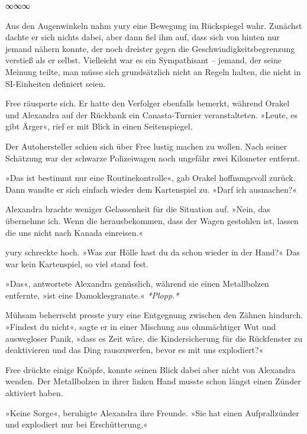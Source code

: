 \begin{center}
	∞∞∞
\end{center}

Aus den Augenwinkeln nahm yury eine Bewegung im Rückspiegel wahr. Zunächst dachte er sich nichts dabei, aber dann fiel ihm auf, dass sich von hinten nur jemand nähern konnte, der noch dreister gegen die Geschwindigkeitsbegrenzung verstieß als er selbst. Vielleicht war es ein Sympathisant – jemand, der seine Meinung teilte, man müsse sich grundsätzlich nicht an Regeln halten, die nicht in SI-Einheiten definiert seien.

Free räusperte sich. Er hatte den Verfolger ebenfalls bemerkt, während Orakel und Alexandra auf der Rückbank ein Canasta-Turnier veranstalteten. »Leute, es gibt Ärger«, rief er mit Blick in einen Seitenspiegel.

 Der Autohersteller schien sich über Free lustig machen zu wollen. Nach seiner Schätzung war der schwarze Polizeiwagen noch ungefähr zwei Kilometer entfernt.

»Das ist bestimmt nur eine Routinekontrolle«, gab Orakel hoffnungsvoll zurück. Dann wandte er sich einfach wieder dem Kartenspiel zu. »Darf ich ausmachen?«

Alexandra brachte weniger Gelassenheit für die Situation auf. »Nein, das übernehme ich. Wenn die herausbekommen, dass der Wagen gestohlen ist, lassen die uns nicht nach Kanada einreisen.«

yury schreckte hoch. »Was zur Hölle hast du da schon wieder in der Hand?« Das war kein Kartenspiel, so viel stand fest.

»Das«, antwortete Alexandra genüsslich, während sie einen Metallbolzen entfernte, »ist eine Damoklesgranate.« \textit{*Plopp.*}

Mühsam beherrscht presste yury eine Entgegnung zwischen den Zähnen hindurch. »Findest du nicht«, sagte er in einer Mischung aus ohnmächtiger Wut und auswegloser Panik, »dass es Zeit wäre, die Kindersicherung für die Rückfenster zu deaktivieren und das Ding rauszuwerfen, bevor es mit uns explodiert?«

Free drückte einige Knöpfe, konnte seinen Blick dabei aber nicht von Alexandra wenden. Der Metallbolzen in ihrer linken Hand musste schon längst einen Zünder aktiviert haben.

»Keine Sorge«, beruhigte Alexandra ihre Freunde. »Sie hat einen Aufprallzünder und explodiert nur bei Erschütterung.«

